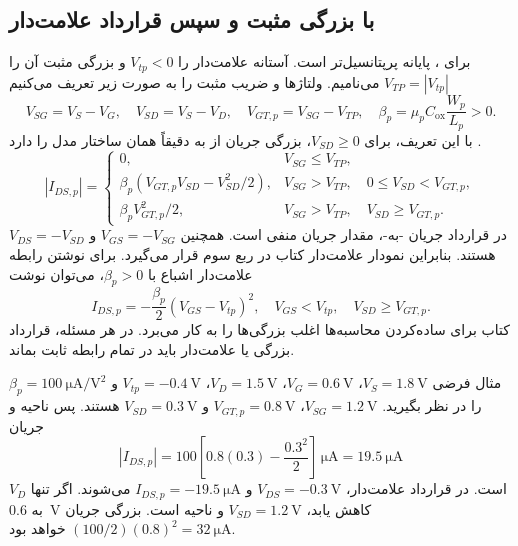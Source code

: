 \subsection{ با بزرگی مثبت و سپس قرارداد علامت‌دار}
برای ،  پایانه پرپتانسیل‌تر است. آستانه علامت‌دار را
\(V_{tp}<0\) و بزرگی مثبت آن را \(V_{TP}=|V_{tp}|\) می‌نامیم.
ولتاژها و ضریب مثبت را به صورت زیر تعریف می‌کنیم
\begin{equation}
 V_{SG}=V_S-V_G,\quad V_{SD}=V_S-V_D,\quad
 V_{GT,p}=V_{SG}-V_{TP},\quad
 \beta_p=\mu_p C_{\mathrm{ox}}\frac{W_p}{L_p}>0.
 \label{eq:mos-p-defs}
\end{equation}
با این تعریف، برای \(V_{SD}\ge0\)، بزرگی جریان از  به 
دقیقاً همان ساختار مدل  را دارد
\cite[صفحه ۶۷ و اسلایدهای ۲۱ و ۲۲]{weste,mos}.
\begin{equation}
 |I_{DS,p}|=\begin{cases}
 0,&V_{SG}\le V_{TP},\\[2pt]
 \beta_p(V_{GT,p}V_{SD}-V_{SD}^2/2),
 &V_{SG}>V_{TP},\quad 0\le V_{SD}<V_{GT,p},\\[2pt]
 \beta_p V_{GT,p}^2/2,
 &V_{SG}>V_{TP},\quad V_{SD}\ge V_{GT,p}.
 \end{cases}
 \label{eq:mos-p-piecewise}
\end{equation}
در قرارداد جریان -به-، مقدار جریان  منفی است.
همچنین \(V_{GS}=-V_{SG}\) و \(V_{DS}=-V_{SD}\) هستند.
بنابراین نمودار علامت‌دار کتاب در ربع سوم قرار می‌گیرد.
برای نوشتن رابطه علامت‌دار اشباع با \(\beta_p>0\)، می‌توان نوشت
\begin{equation}
 I_{DS,p}=-\frac{\beta_p}{2}(V_{GS}-V_{tp})^2,
 \quad V_{GS}<V_{tp},\quad V_{SD}\ge V_{GT,p}.
 \label{eq:mos-p-signed}
\end{equation}
کتاب برای ساده‌کردن محاسبه‌ها اغلب بزرگی‌ها را به کار می‌برد.
در هر مسئله، قرارداد بزرگی یا علامت‌دار باید در تمام رابطه ثابت بماند.

مثال فرضی \(V_S=\qty{1.8}{\volt}\)، \(V_G=\qty{0.6}{\volt}\)،
\(V_D=\qty{1.5}{\volt}\)، \(V_{tp}=-\qty{0.4}{\volt}\) و
\(\beta_p=\qty{100}{\micro\ampere\per\volt\squared}\) را در نظر بگیرید.
\(V_{SG}=\qty{1.2}{\volt}\)، \(V_{GT,p}=\qty{0.8}{\volt}\) و
\(V_{SD}=\qty{0.3}{\volt}\) هستند. پس ناحیه  و جریان
\[
 |I_{DS,p}|=100\left[0.8(0.3)-\frac{0.3^2}{2}\right]\,\unit{\micro\ampere}
 =\qty{19.5}{\micro\ampere}
\]
است. در قرارداد علامت‌دار، \(V_{DS}=-\qty{0.3}{\volt}\) و
\(I_{DS,p}=-\qty{19.5}{\micro\ampere}\) می‌شوند.
اگر تنها \(V_D\) به \qty{0.6}{\volt} کاهش یابد، \(V_{SD}=\qty{1.2}{\volt}\)
و ناحیه  است. بزرگی جریان
\((100/2)(0.8)^2=\qty{32}{\micro\ampere}\) خواهد بود.

